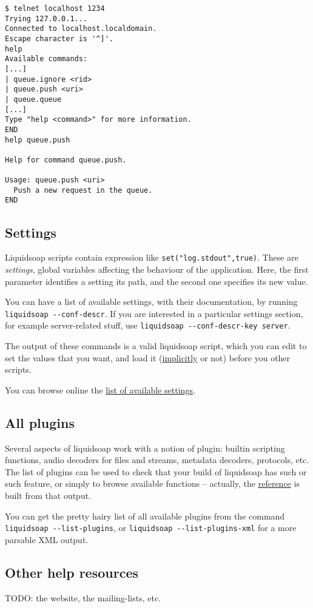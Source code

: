\documentclass{book}
\begin{document}
\begin{verbatim}
$ telnet localhost 1234
Trying 127.0.0.1...
Connected to localhost.localdomain.
Escape character is '^]'.
help
Available commands:
[...]
| queue.ignore <rid>
| queue.push <uri>
| queue.queue
[...]
Type "help <command>" for more information.
END
help queue.push

Help for command queue.push.

Usage: queue.push <uri>
  Push a new request in the queue.
END
\end{verbatim}

\subsection{Settings}
Liquidsoap scripts contain expression like \verb+set("log.stdout",true)+.  These
are \emph{settings}, global variables affecting the behaviour of the
application.  Here, the first parameter identifies a setting its path, and the
second one specifies its new value.

You can have a list of available settings, with their documentation, by running
\verb+liquidsoap --conf-descr+.  If you are interested in a particular settings
section, for example server-related stuff, use
\verb+liquidsoap --conf-descr-key server+.

The output of these commands is a valid liquidsoap script, which you can edit to
set the values that you want, and load it
(\href{script_loading.html}{implicitly} or not) before you other scripts.

You can browse online the \href{settings.html}{list of available settings}.

\subsection{All plugins}
Several aspects of liquidsoap work with a notion of plugin: builtin scripting
functions, audio decoders for files and streams, metadata decoders, protocols,
etc. The list of plugins can be used to check that your build of liquidsoap has
such or such feature, or simply to browse available functions -- actually, the
\href{reference.html}{reference} is built from that output.

You can get the pretty hairy list of all available plugins from the command
\verb+liquidsoap --list-plugins+, or \verb+liquidsoap --list-plugins-xml+ for a
more parsable XML output.

\subsection{Other help resources}
TODO: the website, the mailing-lists, etc.
\end{document}
